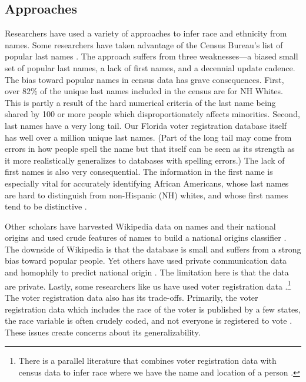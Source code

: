 \documentclass[12pt, letterpaper]{article}
\begin{document}
\subsection*{Approaches} Researchers have used a variety of approaches to infer race and ethnicity from names. Some researchers have taken advantage of the Census Bureau's list of popular last names \citep[see, e.g.,][]{fiscella2006use}. The approach suffers from three weaknesses---a biased small set of popular last names, a lack of first names, and a decennial update cadence. The bias toward popular names in census data has grave consequences. First, over 82\% of the unique last names included in the census are for NH Whites. This is partly a result of the hard numerical criteria of the last name being shared by 100 or more people which disproportionately affects minorities. Second, last names have a very long tail. Our Florida voter registration database itself has well over a million unique last names. (Part of the long tail may come from errors in how people spell the name but that itself can be seen as its strength as it more realistically generalizes to databases with spelling errors.) The lack of first names is also very consequential. The information in the first name is especially vital for accurately identifying African Americans, whose last names are hard to distinguish from non-Hispanic (NH) whites, and whose first names tend to be distinctive \citep{bertrand2004emily}. 

Other scholars have harvested Wikipedia data on names and their national origins and used crude features of names to build a national origins classifier \citep{ambekar2009name}. The downside of Wikipedia is that the database is small and suffers from a strong bias toward popular people. Yet others have used private communication data and homophily to predict national origin \citep{ye2017nationality}. The limitation here is that the data are private. Lastly, some researchers like us have used voter registration data \citep{sood2018predicting, parasurama2021racebert}.\footnote{There is a parallel literature that combines voter registration data with census data to infer race where we have the name and location of a person \citep[see e.g.,]{imai2016improving, kotovadeep}.} The voter registration data also has its trade-offs. Primarily, the voter registration data which includes the race of the voter is published by a few states, the race variable is often crudely coded, and not everyone is registered to vote \citep{ansolabehere2011gender}. These issues create concerns about its generalizability.
\end{document}

